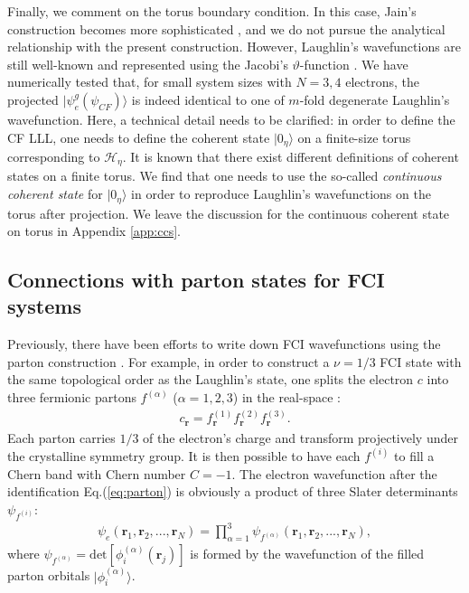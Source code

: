 Finally, we comment on the torus boundary condition. In this case, Jain's construction becomes more sophisticated \cite{pu2017composite}, and we do not pursue the analytical relationship with the present construction. However, Laughlin's wavefunctions are still well-known and represented using the Jacobi's $\vartheta$-function \cite{haldane1985periodic}. We have numerically tested that, for small system sizes with $N=3,4$ electrons, the projected $|\psi^g_e(\psi_{CF})\rangle$ is indeed identical to one of $m$-fold degenerate Laughlin's wavefunction. Here, a technical detail needs to be clarified: in order to define the CF LLL, one needs to define the coherent state $|0_{\eta}\rangle$ on a finite-size torus corresponding to $\mathcal H_{\eta}$. It is known that there exist different definitions of coherent states on a finite torus. We find that one needs to use the so-called \emph{continuous coherent state} \cite{fremling2014coherent} for $|0_{\eta}\rangle$ in order to reproduce Laughlin's wavefunctions on the torus after projection. We leave the discussion for the continuous coherent state on torus in Appendix \ref{app:ccs}.

\subsection{Connections with parton states for FCI systems}\label{sec:connection_eft}
Previously, there have been efforts to write down FCI wavefunctions using the parton construction \cite{lu2012symmetry}. For example, in order to construct a $\nu=1/3$ FCI state with the same topological order as the Laughlin's state, one splits the electron $c$ into three fermionic partons $f^{(\alpha)}$ ($\alpha=1,2,3$) in the real-space \cite{jain1989incompressible}:
\begin{align}
c_{\bm r}=f^{(1)}_{\bm r}f^{(2)}_{\bm r} f^{(3)}_{\bm r}. \label{eq:parton}
\end{align}
Each parton carries $1/3$ of the electron's charge and transform projectively under the crystalline symmetry group. It is then possible to have each $f^{(i)}$ to fill a Chern band with Chern number $C=-1$. The electron wavefunction after the identification Eq.(\ref{eq:parton}) is obviously a product of three Slater determinants $\psi_{f^{(i)}}$:
\begin{align}
\psi_e(\bm r_1,\bm r_2,... ,\bm r_N)=\prod_{\alpha=1}^3\psi_{f^{(\alpha)}}(\bm r_1,\bm r_2,... ,\bm r_N),\label{eq:parton_wavefunc}
\end{align}
where $\psi_{f^{(\alpha)}}=\text{det}[\phi^{(\alpha)}_i(\bm r_j)]$ is formed by the wavefunction of the filled parton orbitals $|\phi^{(\alpha)}_i\rangle$.


